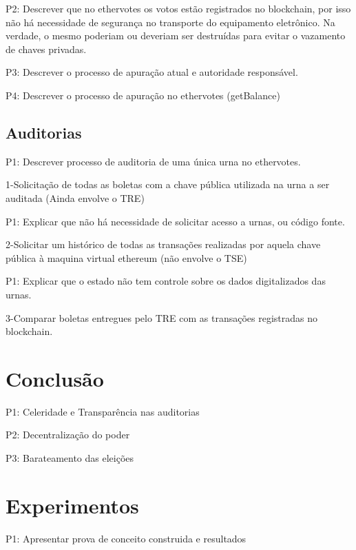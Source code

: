 \documentclass[
	article,			%
	11pt,				%
	oneside,			%
	a4paper,			%
	english,			%
	brazil,				%
	sumario=tradicional
	]{abntex2}
\begin{document}
P2: Descrever que no ethervotes os votos estão registrados no blockchain, por isso não há necessidade de segurança no transporte do equipamento eletrônico. Na verdade, o mesmo poderiam ou deveriam ser destruídas para evitar o vazamento de chaves privadas.

P3: Descrever o processo de apuração atual e autoridade responsável.

P4: Descrever o processo de apuração no ethervotes (getBalance)
\subsection{Auditorias}
P1: Descrever processo de auditoria de uma única urna no ethervotes. 

1-Solicitação de todas as boletas com a chave pública utilizada na urna a ser auditada (Ainda envolve o TRE)

P1: Explicar que não há necessidade de solicitar acesso a urnas, ou código fonte.

2-Solicitar um histórico de todas as transações realizadas por aquela chave pública à maquina virtual ethereum (não envolve o TSE)

P1: Explicar que o estado não tem controle sobre os dados digitalizados das urnas.

3-Comparar boletas entregues pelo TRE com as transações registradas no blockchain. 

\section{Conclusão}
  P1: Celeridade e Transparência nas auditorias
  
  P2: Decentralização do poder
  
  P3: Barateamento das eleições
  
  
\section{Experimentos}

  P1: Apresentar prova de conceito construida e resultados
  
  

\end{document}

